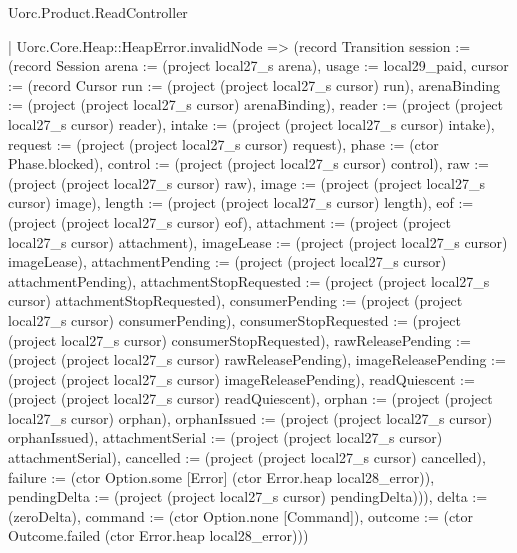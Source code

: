 \begin{lexlean}{Uorc.Product.ReadController}
\begin{semanticmodule}
{    | Uorc.Core.Heap::HeapError.invalidNode => (record Transition {session := (record Session {arena := (project local27_s arena), usage := local29_paid, cursor := (record Cursor {run := (project (project local27_s cursor) run), arenaBinding := (project (project local27_s cursor) arenaBinding), reader := (project (project local27_s cursor) reader), intake := (project (project local27_s cursor) intake), request := (project (project local27_s cursor) request), phase := (ctor Phase.blocked), control := (project (project local27_s cursor) control), raw := (project (project local27_s cursor) raw), image := (project (project local27_s cursor) image), length := (project (project local27_s cursor) length), eof := (project (project local27_s cursor) eof), attachment := (project (project local27_s cursor) attachment), imageLease := (project (project local27_s cursor) imageLease), attachmentPending := (project (project local27_s cursor) attachmentPending), attachmentStopRequested := (project (project local27_s cursor) attachmentStopRequested), consumerPending := (project (project local27_s cursor) consumerPending), consumerStopRequested := (project (project local27_s cursor) consumerStopRequested), rawReleasePending := (project (project local27_s cursor) rawReleasePending), imageReleasePending := (project (project local27_s cursor) imageReleasePending), readQuiescent := (project (project local27_s cursor) readQuiescent), orphan := (project (project local27_s cursor) orphan), orphanIssued := (project (project local27_s cursor) orphanIssued), attachmentSerial := (project (project local27_s cursor) attachmentSerial), cancelled := (project (project local27_s cursor) cancelled), failure := (ctor Option.some [Error] (ctor Error.heap local28_error)), pendingDelta := (project (project local27_s cursor) pendingDelta)})}), delta := (zeroDelta), command := (ctor Option.none [Command]), outcome := (ctor Outcome.failed (ctor Error.heap local28_error))})
}
\end{semanticmodule}
\end{lexlean}
